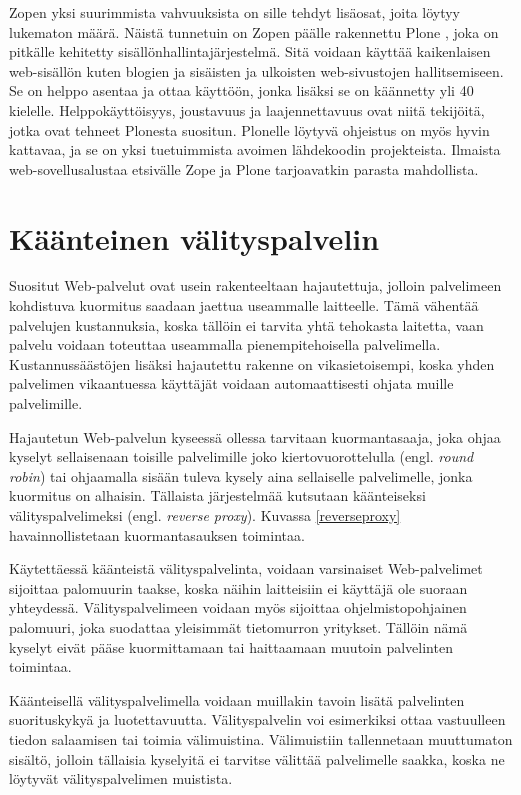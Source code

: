 Zopen yksi suurimmista vahvuuksista on sille tehdyt lisäosat, joita löytyy lukematon määrä. Näistä tunnetuin on Zopen päälle rakennettu Plone \cite{Plone}, joka on pitkälle kehitetty 
sisällönhallintajärjestelmä. Sitä voidaan käyttää kaikenlaisen web-sisällön kuten blogien ja sisäisten ja ulkoisten web-sivustojen hallitsemiseen. Se on helppo asentaa ja ottaa käyttöön, 
jonka lisäksi se on käännetty yli 40 kielelle. Helppokäyttöisyys, joustavuus ja laajennettavuus ovat niitä tekijöitä, jotka ovat tehneet Plonesta suositun. Plonelle löytyvä ohjeistus
on myös hyvin kattavaa, ja se on yksi tuetuimmista avoimen lähdekoodin projekteista. Ilmaista web-sovellusalustaa etsivälle Zope ja Plone tarjoavatkin parasta mahdollista.

\section{Käänteinen välityspalvelin}

Suositut Web-palvelut ovat usein rakenteeltaan hajautettuja, jolloin
palvelimeen kohdistuva kuormitus saadaan jaettua useammalle
laitteelle. Tämä vähentää palvelujen kustannuksia, koska tällöin ei
tarvita yhtä tehokasta laitetta, vaan palvelu voidaan toteuttaa
useammalla pienempitehoisella palvelimella. Kustannussäästöjen lisäksi
hajautettu rakenne on vikasietoisempi, koska yhden palvelimen
vikaantuessa käyttäjät voidaan automaattisesti ohjata muille
palvelimille.

Hajautetun Web-palvelun kyseessä ollessa tarvitaan kuormantasaaja,
joka ohjaa kyselyt sellaisenaan toisille palvelimille joko
kiertovuorottelulla (engl. \textit{round robin}) tai ohjaamalla sisään
tuleva kysely aina sellaiselle palvelimelle, jonka kuormitus on
alhaisin. Tällaista järjestelmää kutsutaan käänteiseksi
välityspalvelimeksi (engl. \textit{reverse proxy}). Kuvassa
\ref{reverseproxy} havainnollistetaan kuormantasauksen toimintaa.

Käytettäessä käänteistä välityspalvelinta, voidaan varsinaiset
Web-palvelimet sijoittaa palomuurin taakse, koska näihin laitteisiin
ei käyttäjä ole suoraan yhteydessä. Välityspalvelimeen voidaan myös
sijoittaa ohjelmistopohjainen palomuuri, joka suodattaa yleisimmät
tietomurron yritykset. Tällöin nämä kyselyt eivät pääse
kuormittamaan tai haittaamaan muutoin palvelinten toimintaa.

Käänteisellä välityspalvelimella voidaan muillakin tavoin lisätä
palvelinten suorituskykyä ja luotettavuutta. Välityspalvelin voi
esimerkiksi ottaa vastuulleen tiedon salaamisen tai toimia
välimuistina. Välimuistiin tallennetaan muuttumaton sisältö, jolloin
tällaisia kyselyitä ei tarvitse välittää palvelimelle saakka, koska ne
löytyvät välityspalvelimen muistista.

